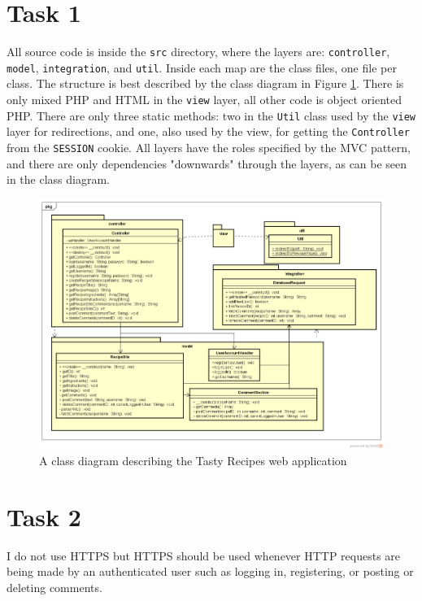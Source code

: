 \documentclass[a4paper]{scrreprt}
\newcommand{\code}[1]{\texttt{#1}}
\begin{document}
\section{Task 1}

All source code is inside the \code{src} directory, where the layers are: \code{controller}, \code{model}, \code{integration}, and \code{util}. Inside each map are the class files, one file per class. The structure is best described by the class diagram in Figure \ref{fig:classdia}. There is only mixed PHP and HTML in the \code{view} layer, all other code is object oriented PHP. There are only three static methods: two in the \code{Util} class used by the \code{view} layer for redirections, and one, also used by the view, for getting the \code{Controller} from the \code{SESSION} cookie. All layers have the roles specified by the MVC pattern, and there are only dependencies "downwards" through the layers, as can be seen in the class diagram.

\begin{figure}[h!]
  \begin{center}
    \includegraphics[scale=0.18]{img/TastyRecipesMVC.png}
    \caption{A class diagram describing the Tasty Recipes web application}
    \label{fig:classdia}
  \end{center}
\end{figure}

\section{Task 2}
I do not use HTTPS but HTTPS should be used whenever HTTP requests are being made by an authenticated user such as logging in, registering, or posting or deleting comments.
\end{document}
